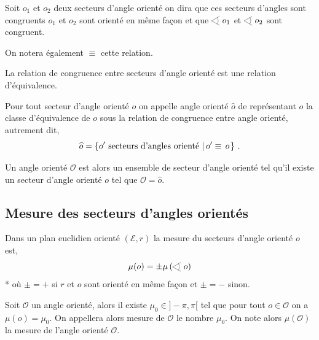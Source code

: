 \begin{defi}
Soit $o_1$ et $o_2$ deux secteurs d'angle orienté on dira que ces secteurs d'angles sont congruents \ssi $o_1$ et $o_2$ sont orienté en même façon et que $\anglesaillant o_1$ et $\anglesaillant o_2$ sont congruent. 

On notera également $\equiv$ cette relation.
\end{defi}
\begin{prop}
    La relation de congruence entre secteurs d'angle orienté est une relation d'équivalence.
\end{prop}
\begin{defi}
    Pour tout secteur d'angle orienté $o$ on appelle angle orienté $\widehat{o}$ de représentant $o$ la classe d'équivalence de $o$ sous la relation de congruence entre angle orienté, autrement dit,
    \begin{equation*}
        \widehat{o} = \left\{o' \text{ secteurs d'angles orienté}\,\left|\,o' \equiv \, o\right.\right\}\,.
    \end{equation*}
    
    Un angle orienté $\mathcal{O}$ est alors un ensemble de secteur d'angle orienté tel qu'il existe un secteur d'angle orienté $o$ tel que $\mathcal{O}=\widehat{o}$. 
\end{defi}

        \subsection{Mesure des secteurs d'angles orientés}

\begin{defi}
    Dans un plan euclidien orienté $(\mathcal{E},r)$ la mesure du secteurs d'angle orienté $o$ est,
    \begin{equation*}
        \mu(o) = \pm \mu\left(\anglesaillant o\right)
    \end{equation*}*
    où $\pm = +$ si $r$ et $o$ sont orienté en même façon et $\pm = -$ sinon.
\end{defi}
\begin{thm}
    Soit $\mathcal{O}$ un angle orienté, alors il existe $\mu_0\in ]-\pi,\pi[$ tel que pour tout $o\in \mathcal{O}$ on a $\mu(o)=\mu_0$. On appellera alors mesure de $\mathcal{O}$ le nombre $\mu_0$. On note alors $\mu\left(\mathcal{O}\right)$ la mesure de l'angle orienté $\mathcal{O}$.  
\end{thm}
